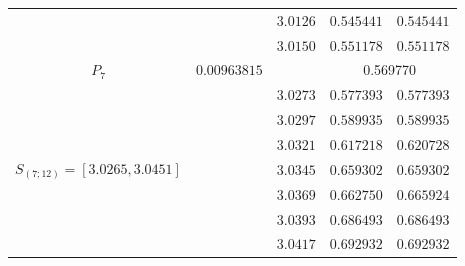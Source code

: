 \documentclass[10pt]{amsart}
\numberwithin{equation}{section}
\theoremstyle{definition}
\newcommand\intpx[2]{S_{(#1;#2)}}
\begin{document}
\begin{longtable}{|c|c|c|c|c|}
  &  &  $3.0126 $  &  $ 0.545441 $ & $ 0.545441 $ \\
  &  &  $3.0150 $  &  $ 0.551178 $ & $ 0.551178 $ \\
    \hline
        $P_7$ &  $0.00963815$ & & \multicolumn{2}{c|}{0.569770}  \\
    \hline
  \multirow{8}{*}{ $ \intpx{7}{12} =  [3.0265,3.0451] $  } 
  &  &  $3.0273 $  &  $ 0.577393 $ & $ 0.577393 $ \\
  &  &  $3.0297 $  &  $ 0.589935 $ & $ 0.589935 $ \\
  &  &  $3.0321 $  &  $ 0.617218 $ & $ 0.620728 $ \\
  &  &  $3.0345 $  &  $ 0.659302 $ & $ 0.659302 $ \\
  &  &  $3.0369 $  &  $ 0.662750 $ & $ 0.665924 $ \\
  &  &  $3.0393 $  &  $ 0.686493 $ & $ 0.686493 $ \\
  &  &  $3.0417 $  &  $ 0.692932 $ & $ 0.692932 $ \\

\end{longtable}
\end{document}
